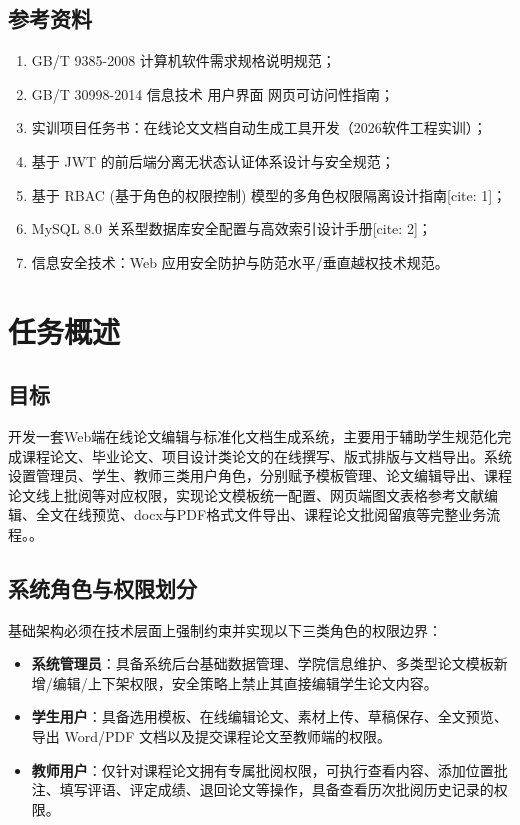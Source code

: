 \documentclass{../template/softeng}
\begin{document}
\subsection{参考资料}
\begin{enumerate}
    \item GB/T 9385-2008 计算机软件需求规格说明规范；
    \item GB/T 30998-2014 信息技术 用户界面 网页可访问性指南；
    \item 实训项目任务书：在线论文文档自动生成工具开发（2026软件工程实训）；
    \item 基于 JWT 的前后端分离无状态认证体系设计与安全规范；
    \item 基于 RBAC (基于角色的权限控制) 模型的多角色权限隔离设计指南[cite: 1]；
    \item MySQL 8.0 关系型数据库安全配置与高效索引设计手册[cite: 2]；
    \item 信息安全技术：Web 应用安全防护与防范水平/垂直越权技术规范。
\end{enumerate}

\section{任务概述}
\subsection{目标}
开发一套Web端在线论文编辑与标准化文档生成系统，主要用于辅助学生规范化完成课程论文、毕业论文、项目设计类论文的在线撰写、版式排版与文档导出。系统设置管理员、学生、教师三类用户角色，分别赋予模板管理、论文编辑导出、课程论文线上批阅等对应权限，实现论文模板统一配置、网页端图文表格参考文献编辑、全文在线预览、docx与PDF格式文件导出、课程论文批阅留痕等完整业务流程。。

\subsection{系统角色与权限划分}
基础架构必须在技术层面上强制约束并实现以下三类角色的权限边界：
\begin{itemize}
    \item \textbf{系统管理员}：具备系统后台基础数据管理、学院信息维护、多类型论文模板新增/编辑/上下架权限，安全策略上禁止其直接编辑学生论文内容。
    \item \textbf{学生用户}：具备选用模板、在线编辑论文、素材上传、草稿保存、全文预览、导出 Word/PDF 文档以及提交课程论文至教师端的权限。
    \item \textbf{教师用户}：仅针对课程论文拥有专属批阅权限，可执行查看内容、添加位置批注、填写评语、评定成绩、退回论文等操作，具备查看历次批阅历史记录的权限。
\end{itemize}
\end{document}
